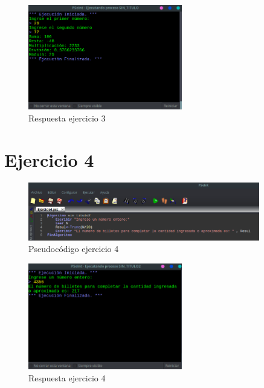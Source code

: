 \documentclass[11pt, a4paper]{report}
\begin{document}
\begin{figure}[!ht]
\begin{center}
  \includegraphics[width=0.6\textwidth]{respuesta4.png}
  \caption{Respuesta ejercicio 3}
\end{center}
\end{figure} 

\newpage
\section*{Ejercicio 4}

\begin{figure}[!ht]
\begin{center}
  \includegraphics[width=0.9\textwidth]{ejercicio4.png}
  \caption{Pseudoc\'odigo ejercicio 4}
\end{center}
\end{figure}

\begin{figure}[!ht]
\begin{center}
  \includegraphics[width=0.6\textwidth]{respuesta5.png}
  \caption{Respuesta ejercicio 4}
\end{center}
\end{figure}
\end{document}
